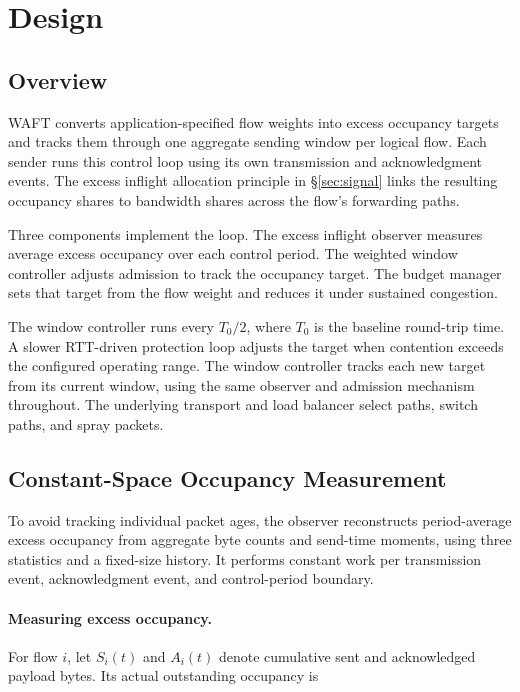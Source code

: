 \section{Design}
\label{sec:design}
\subsection{Overview}
\label{sec:overview}

WAFT converts application-specified flow weights into excess occupancy targets and tracks them through one aggregate sending window per logical flow. Each sender runs this control loop using its own transmission and acknowledgment events. The excess inflight allocation principle in \S\ref{sec:signal} links the resulting occupancy shares to bandwidth shares across the flow's forwarding paths.

Three components implement the loop. The excess inflight observer measures average excess occupancy over each control period. The weighted window controller adjusts admission to track the occupancy target. The budget manager sets that target from the flow weight and reduces it under sustained congestion.

The window controller runs every \(T_0/2\), where \(T_0\) is the baseline round-trip time. A slower RTT-driven protection loop adjusts the target when contention exceeds the configured operating range. The window controller tracks each new target from its current window, using the same observer and admission mechanism throughout. The underlying transport and load balancer select paths, switch paths, and spray packets.

\subsection{Constant-Space Occupancy Measurement}
\label{sec:observer}

To avoid tracking individual packet ages, the observer reconstructs period-average excess occupancy from aggregate byte counts and send-time moments, using three statistics and a fixed-size history. It performs constant work per transmission event, acknowledgment event, and control-period boundary.

\paragraph{Measuring excess occupancy.}

For flow \(i\), let \(S_i(t)\) and \(A_i(t)\) denote cumulative sent and acknowledged payload bytes. Its actual outstanding occupancy is

